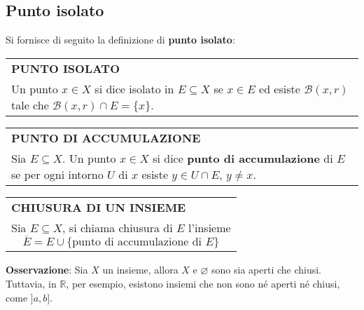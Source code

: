 \documentclass[a4paper]{extarticle}
\renewcommand\arraystretch{}
\begin{document}
\vspace{1em}
\noindent
\subsection{Punto isolato}
Si fornisce di seguito la definizione di \textbf{punto isolato}:

\vspace{1em}
\setlength{\tabcolsep}{14pt}
\renewcommand{\arraystretch}{2}
\noindent
\begin{tabularx}{\textwidth}{@{}|P|@{}}
    \hline
    {\textbf{PUNTO ISOLATO}}\\
    \parbox{\linewidth}{Un punto $x \in X$ si dice isolato in $E \subseteq X$ se $x \in E$ ed esiste $\mathcal{B}(x,r)$ tale che $\mathcal{B}(x,r) \cap E = \{x\}$. \vspace{3mm}}\\
    \hline
\end{tabularx}


\vspace{1em}
\setlength{\tabcolsep}{14pt}
\renewcommand{\arraystretch}{2}
\noindent
\begin{tabularx}{\textwidth}{@{}|P|@{}}
    \hline
    {\textbf{PUNTO DI ACCUMULAZIONE}}\\
    \parbox{\linewidth}{Sia $E \subseteq X$. Un punto $x \in X$ si dice \textbf{punto di accumulazione} di $E$ se per ogni intorno $U$ di $x$ esiste $y \in U \cap E$, $y \neq x$. \vspace{3mm}}\\
    \hline
\end{tabularx}

\vspace{1em}
\setlength{\tabcolsep}{14pt}
\renewcommand{\arraystretch}{2}
\noindent
\begin{tabularx}{\textwidth}{@{}|P|@{}}
    \hline
    {\textbf{CHIUSURA DI UN INSIEME}}\\
    \parbox{\linewidth}{Sia $E \subseteq X$, si chiama chiusura di $E$ l'insieme
    \[\overline{E} = E \cup \{\text{punto di accumulazione di } E\}\]
    \vspace{-2mm}}\\
    \hline
\end{tabularx}

\vspace{2em}
\noindent
\textbf{Osservazione}: Sia $X$ un insieme, allora $X$ e $\varnothing$ sono sia aperti che chiusi. Tuttavia, in $\mathbb{R}$, per esempio, esistono insiemi che non sono né aperti né chiusi, come $]a,b]$.
\end{document}
